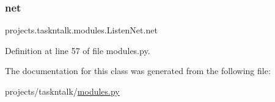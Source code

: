 \subsubsection{\texorpdfstring{net}{net}}
{\footnotesize\ttfamily projects.\+taskntalk.\+modules.\+Listen\+Net.\+net}



Definition at line 57 of file modules.\+py.



The documentation for this class was generated from the following file\+:\begin{DoxyCompactItemize}
\item 
projects/taskntalk/\hyperlink{projects_2taskntalk_2modules_8py}{modules.\+py}\end{DoxyCompactItemize}
